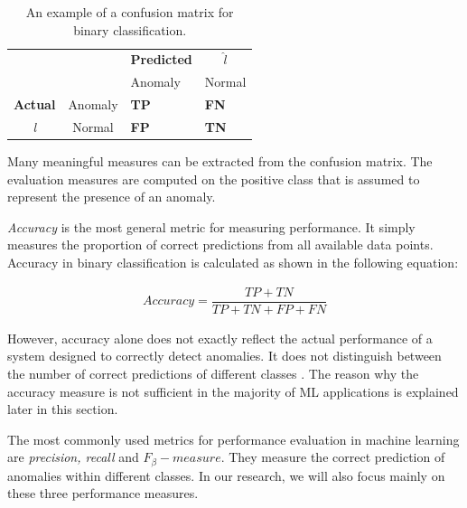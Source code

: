 \begin{table}[!h]
\centering
\begin{tabular}{cccc}
\multicolumn{1}{r}{}                 &                              & \textbf{Predicted}          &   $\hat{l}$                          \\ \cline{3-4} 
                                     & \multicolumn{1}{l|}{}        & \multicolumn{1}{l|}{Anomaly} & \multicolumn{1}{l|}{Normal} \\ \cline{2-4} 
                                      
\multicolumn{1}{l|}{\textbf{Actual}} & \multicolumn{1}{l|}{Anomaly}  & \multicolumn{1}{l|}{\textcolor{customBlue}{\textbf{TP}}}     & \multicolumn{1}{l|}{\textcolor{customRed}{\textbf{FN}}}      \\ \cline{2-4} 
\multicolumn{1}{c|}{\textit{l}}                & \multicolumn{1}{c|}{Normal} & \multicolumn{1}{l|}{\textcolor{customDarkRed}{\textbf{FP}}}     & \multicolumn{1}{l|}{\textcolor{customGreen}{\textbf{TN}}}     \\ \cline{2-4} 
\end{tabular}
\caption{An example of a confusion matrix for binary classification.}
\label{table:confusionMatrix}
\end{table}
 
Many meaningful measures can be extracted from the confusion matrix. The evaluation measures are computed on the positive class that is assumed to represent the presence of an anomaly.

\textit{Accuracy} is the most general metric for measuring performance. It simply measures the proportion of correct predictions from all available data points. Accuracy in binary classification is calculated as shown in the following equation:

\begin{align}
    Accuracy = \dfrac{TP + TN}{TP + TN + FP + FN}
\end{align}

However, accuracy alone does not exactly reflect the actual performance of a system designed to correctly detect anomalies. It does not distinguish between the number of correct predictions of different classes \cite{performanceEvaluation2006}. The reason why the accuracy measure is not sufficient in the majority of ML applications is explained later in this section. 

The most commonly used metrics for performance evaluation in machine learning are \textit{precision, recall} and ${F_{\beta}-measure}$. They measure the correct prediction of anomalies within different classes. In our research, we will also focus mainly on these three performance measures.

